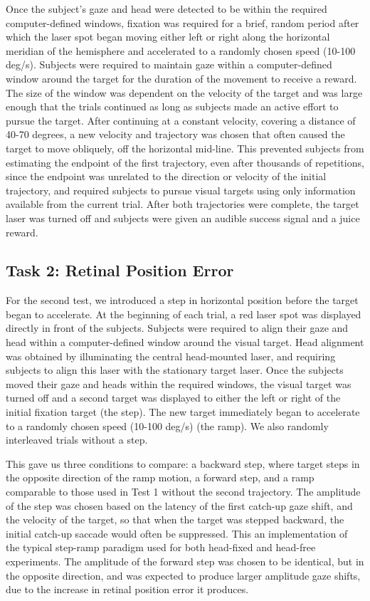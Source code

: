 \documentclass[12pt]{article}
\begin{document}
Once the subject's gaze and head were detected to be within the required computer-defined windows, fixation was required for a brief, random period after which the laser spot began moving either left or right along the horizontal meridian of the hemisphere and accelerated to a randomly chosen speed (10-100 deg/s). Subjects were required to maintain gaze within a computer-defined window around the target for the duration of the movement to receive a reward. The size of the window was dependent on the velocity of the target and was large enough that the trials continued as long as subjects made an active effort to pursue the target. After continuing at a constant velocity, covering a distance of 40-70 degrees, a new velocity and trajectory was chosen that often caused the target to move obliquely, off the horizontal mid-line. This prevented subjects from estimating the endpoint of the first trajectory, even after thousands of repetitions, since the endpoint was unrelated to the direction or velocity of the initial trajectory, and required subjects to pursue visual targets using only information available from the current trial. After both trajectories were complete, the target laser was turned off and subjects were given an audible success signal and a juice reward. 

\subsection{Task 2: Retinal Position Error}
For the second test, we introduced a step in horizontal position before the target began to accelerate. At the beginning of each trial, a red laser spot was displayed directly in front of the subjects. Subjects were required to align their gaze and head within a computer-defined window around the visual target. Head alignment was obtained by illuminating the central head-mounted laser, and requiring subjects to align this laser with the stationary target laser. Once the subjects moved their gaze and heads within the required windows, the visual target was turned off and a second target was displayed to either the left or right of the initial fixation target (the step). The new target immediately began to accelerate to a randomly chosen speed (10-100 deg/s) (the ramp). We also randomly interleaved trials without a step. 

This gave us three conditions to compare: a backward step, where target steps in the opposite direction of the ramp motion, a forward step, and a ramp comparable to those used in Test 1 without the second trajectory. The amplitude of the step was chosen based on the latency of the first catch-up gaze shift, and the velocity of the target, so that when the target was stepped backward, the initial catch-up saccade would often be suppressed. This an implementation of the typical step-ramp paradigm used for both head-fixed and head-free experiments. The amplitude of the forward step was chosen to be identical, but in the opposite direction, and was expected to produce larger amplitude gaze shifts, due to the increase in retinal position error it produces.
\end{document}
